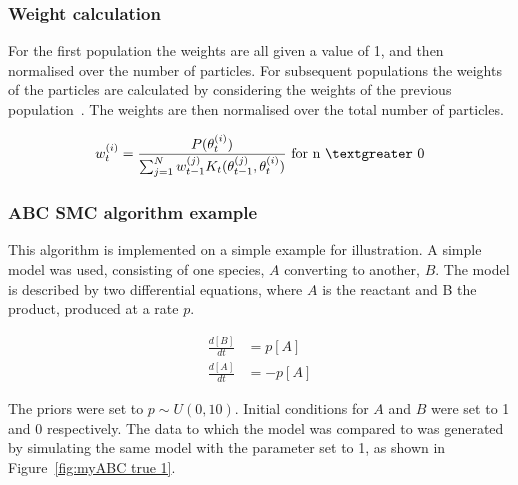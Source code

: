\subsubsection{Weight calculation}
\label{sec:weight}
For the first population the weights are all given a value of 1, and then normalised over the number of particles. For subsequent populations the weights of the particles are calculated by considering the weights of the previous population~\autocite{Toni:2009tr}. The weights are then normalised over the total number of particles. 


\begin{align}
w_{t}^{(i)} = \frac{P(\theta_{t}^{(i)})}{\sum_{j=1}^N w_{t-1}^{(j)} K_{t}(\theta_{t-1}^{(j)}, \theta_{t}^{(i)})} \text{ for n $\textgreater$  0}
\end{align}
	
	
\subsubsection{ABC SMC algorithm example}	
This algorithm is implemented on a simple example for illustration. A simple model was used, consisting of one species, $A$ converting to another, $B$. The model is described by two differential equations, where $A$ is the reactant and B the product, produced at a rate $p$. 

\begin{align}
\frac{d[B]}{dt} &= p[A] \\ 
\frac{d[A]}{dt} &= -p[A] 
\end{align}

The priors were set to $p \sim U(0, 10)$. Initial conditions for $A$ and $B$ were set to 1 and 0 respectively. The data to which the model was compared to was generated by simulating the same model with the parameter set to 1, as shown in Figure~\ref{fig:myABC true 1}.

